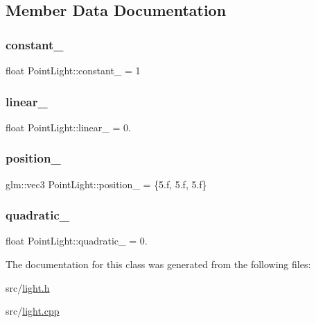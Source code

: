 \subsection{Member Data Documentation}
\mbox{\label{classPointLight_ac66b99d54650b57401ae4f7d3c1c22f4}} 
\subsubsection{\texorpdfstring{constant\+\_\+}{constant\_}}
{\footnotesize\ttfamily float Point\+Light\+::constant\+\_\+ = 1}

\mbox{\label{classPointLight_a11a41268a4d9e19d45eed18ba1ad8e43}} 
\subsubsection{\texorpdfstring{linear\+\_\+}{linear\_}}
{\footnotesize\ttfamily float Point\+Light\+::linear\+\_\+ = 0.}

\mbox{\label{classPointLight_a6ab3a936be50472a3b5a064edc18f5ce}} 
\subsubsection{\texorpdfstring{position\+\_\+}{position\_}}
{\footnotesize\ttfamily glm\+::vec3 Point\+Light\+::position\+\_\+ = \{5.f, 5.f, 5.f\}}

\mbox{\label{classPointLight_a7adf3997d566c55fb2878db179d4867d}} 
\subsubsection{\texorpdfstring{quadratic\+\_\+}{quadratic\_}}
{\footnotesize\ttfamily float Point\+Light\+::quadratic\+\_\+ = 0.}



The documentation for this class was generated from the following files\+:\begin{DoxyCompactItemize}
\item 
src/\hyperlink{light_8h}{light.\+h}\item 
src/\hyperlink{light_8cpp}{light.\+cpp}\end{DoxyCompactItemize}
